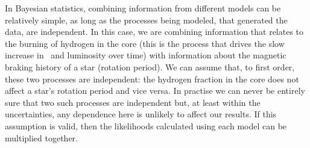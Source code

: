 




In Bayesian statistics, combining information from different models can be
relatively simple, as long as the processes being modeled, that generated the
data, are independent.
In this case, we are combining information that relates to the burning of
hydrogen in the core (this is the process that drives the slow increase in
\teff\ and luminosity over time) with information about the magnetic braking
history of a star (rotation period).
We can assume that, to first order, these two processes are independent: the
hydrogen fraction in the core does not affect a star's rotation period and
vice versa.
In practise we can never be entirely sure that two such processes are
independent but, at least within the uncertainties, any dependence here is
unlikely to affect our results.
If this assumption is valid, then the likelihoods calculated using each model
can be multiplied together.

